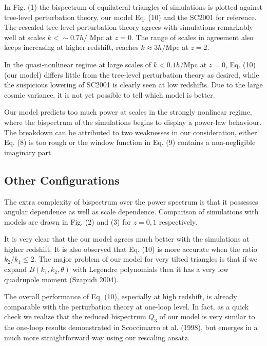 \documentclass[]{mn2e}
\begin{document}
In Fig. (1) the bispectrum of equilateral triangles of simulations
is plotted against tree-level perturbation theory, our model Eq.
(10) and the SC2001 for reference. The rescaled tree-level
perturbation theory agrees with simulations remarkably well at
scales $k<\sim 0.7h/$ Mpc at $z=0$. The range of scales in agreement
also keeps increasing at higher redshift, reaches $k\approx 3h/$Mpc
at $z=2$.

In the quasi-nonlinear regime at large scales of $k<0.1h/$Mpc at
$z=0$, Eq. (10) (our model) differs little from the tree-level
perturbation theory as desired, while the suspicious lowering of
SC2001 is clearly seen at low redshifts. Due to the large cosmic
variance, it is not yet possible to tell which model is better.

Our model predicts too much power at scales in the strongly
nonlinear regime, where the bispectrum of the simulations begins to
display a power-law behaviour. The breakdown  can be attributed to
two weaknesses in our consideration, either Eq. (8) is too rough or
the window function in Eq. (9) contains a non-negligible imaginary
part.

\subsection{Other Configurations}
The extra complexity of bispectrum over the power spectrum is that
it possesses angular dependence as well as scale dependence.
Comparison of simulations with models are drawn in Fig. (2) and (3)
for $z=0, 1$ respectively.

It is very clear that the our model agrees much better with the
simulations at higher redshift. It is also observed that Eq. (10) is
more accurate when the ratio $k_2/k_1 \le 2$. The major problem of
our model for very tilted triangles is that if we expand $B(k_1,
k_2, \theta)$ with Legendre polynomials then it has a very low
quadrupole moment (Szapudi 2004).

The overall performance of Eq. (10), especially at high redshift, is
already comparable with the perturbation theory at one-loop level.
In fact, as a quick check we realize that the reduced bispectrum
$Q_3$ of our model is very similar to the one-loop results
demonstrated in Scoccimarro et al. (1998), but emerges in a much
more straightforward way using our rescaling ansatz.

\end{document}
